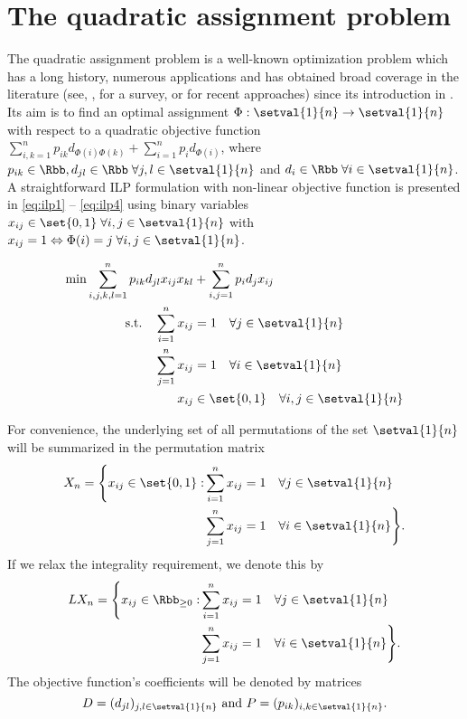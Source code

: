 \section{The quadratic assignment problem}

The quadratic assignment problem is a well-known optimization problem which has a long history, numerous applications and has obtained broad coverage in the literature (see, \eg, \cite{MR2267435} for a survey, or \cite{MR1924955,MR1290346,MR2238659,MR3084089,MR2979433,nyberg2014some,MR2373098,MR2913063,MR2314426} for recent approaches) since its introduction in \cite{MR0089106}. Its aim is to find an optimal assignment $\Phi: \setval{1}{n} \rightarrow\setval{1}{n}$ with respect to a quadratic objective function $\sum_{i,k = 1}^n p_{ik}d_{\Phi(i)\Phi(k)} +\sum_{i = 1}^np_id_{\Phi(i)}$, where $p_{ik}\in\Rbb, d_{jl}\in\Rbb\;\forall j,l\in\setval{1}{n}$ and $d_i\in\Rbb\;\forall i\in\setval{1}{n}$. A straightforward ILP formulation with non-linear objective function is presented in \eqref{eq:ilp1} -- \eqref{eq:ilp4} using binary variables $x_{ij}\in\set{0,1}\;\forall i,j\in\setval{1}{n}$ with $x_{ij}=1 \Leftrightarrow \Phi(i)=j\;\forall i,j\in\setval{1}{n}$.

\begin{align}
	\label{eq:ilp1}
	\min \sum_{i,j,k,l = 1}^n p_{ik}d_{jl}x_{ij}x_{kl} &+\sum_{i,j = 1}^np_id_jx_{ij}\\
	\text{s.t.}\quad\sum_{i=1}^n x_{ij}&= 1\quad\forall j\in\setval{1}{n}\\
	\sum_{j=1}^n x_{ij}&= 1\quad\forall i\in\setval{1}{n}\\
	\label{eq:ilp4}
	x_{ij}&\in\set{0,1}\quad\forall i,j\in\setval{1}{n}
\end{align}

For convenience, the underlying set of all permutations of the set $\setval{1}{n}$ will be summarized in the permutation matrix
\begin{align*}
	X_n = \Bigg\{x_{ij}\in\set{0,1}:&\sum_{i=1}^n x_{ij}= 1\quad\forall j\in\setval{1}{n}\\
	&\sum_{j=1}^n x_{ij}= 1\quad\forall i\in\setval{1}{n}\Bigg\}.
\end{align*}
If we relax the integrality requirement, we denote this by
\begin{align*}
	LX_n = \Bigg\{x_{ij}\in\Rbb_{\geq 0}:&\sum_{i=1}^n x_{ij}= 1\quad\forall j\in\setval{1}{n}\\
	&\sum_{j=1}^n x_{ij}= 1\quad\forall i\in\setval{1}{n}\Bigg\}.
\end{align*}
The objective function's coefficients will be denoted by matrices 
\begin{equation*}
	D = (d_{jl})_{j,l\in\setval{1}{n}}\text{ and } P = (p_{ik})_{i,k\in\setval{1}{n}}.
\end{equation*}

